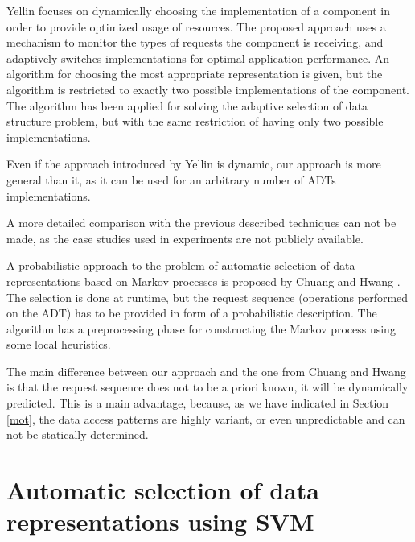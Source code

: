 Yellin  \cite{Yellin} focuses on dynamically choosing the implementation  of a component in order to provide optimized usage of resources. The proposed approach uses a mechanism to monitor the types of requests the component is receiving, and adaptively switches implementations for optimal application performance. An algorithm for choosing the most appropriate representation is given, but the algorithm is restricted to exactly two possible implementations of the component. The algorithm has been applied for solving the adaptive selection of data structure problem, but with the same restriction of having only two possible implementations.

Even if the approach introduced by Yellin  \cite{Yellin} is dynamic, our approach is more general than it, as it can be used for an arbitrary number of ADTs implementations.

A more detailed comparison with the previous described techniques can not be made, as the case studies used in experiments are not publicly available.

A probabilistic approach to the problem of automatic selection of data representations based on Markov processes is proposed  by Chuang and Hwang \cite{chuang}. The selection is done at runtime, but the request sequence (operations performed on the ADT) has to be provided in form of a probabilistic description. The algorithm has a preprocessing phase for constructing the Markov process using some local heuristics.

The main difference between our approach and the one from Chuang and Hwang  \cite{chuang} is that the request sequence does not to be a priori known, it will be dynamically predicted. This is a main advantage, because, as we have indicated in Section \ref{mot}, the data access patterns are highly variant, or even unpredictable and can not be statically determined.

\section{Automatic selection of data representations using SVM}
\label{sec:drspsvm}


